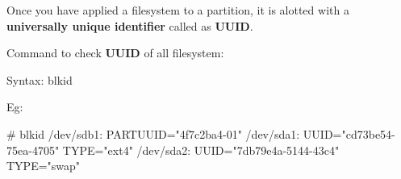 \begin{flushleft}
Once you have applied a filesystem to a partition, it is alotted with a \textbf{universally unique identifier} called as \textbf{UUID}. 

\newline
Command to check \textbf{UUID} of all filesystem:

\bigskip
\begin{tcolorbox}[breakable,notitle,boxrule=-0pt,colback=pink,colframe=pink]
	\color{black}
	\font=9pt
	Syntax: blkid
	\font=4pt
\end{tcolorbox}

Eg:
\begin{tcolorbox}[breakable,notitle,boxrule=-0pt,colback=black,colframe=black]
	\color{green}
	\font=9pt
	\# blkid
	\newline
	\color{white}
	/dev/sdb1: PARTUUID="4f7c2ba4-01"
	\newline
	/dev/sda1: UUID="cd73be54-75ea-4705" TYPE="ext4"
	\newline
	/dev/sda2: UUID="7db79e4a-5144-43c4" TYPE="swap"
	\font=4pt
\end{tcolorbox}

\end{flushleft}
\newpage

